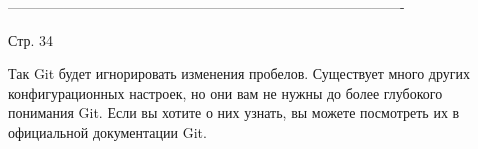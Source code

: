 -------------------------------------------------------------------------------------

Стр. 34

Так Git будет игнорировать изменения пробелов. Существует много других конфигурационных
настроек, но они вам не нужны до более глубокого понимания Git. Если вы хотите о них
узнать, вы можете посмотреть их в официальной документации Git.